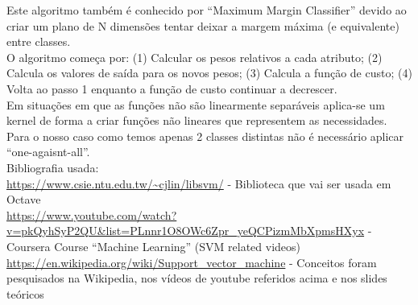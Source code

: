 \documentclass[portugues,final]{revdetua}
\begin{document}
Este algoritmo também é conhecido por “Maximum Margin Classifier” devido ao criar um plano de N dimensões tentar deixar a margem máxima (e equivalente) entre classes.\\

O algoritmo começa por: (1) Calcular os pesos relativos a cada atributo; (2) Calcula os valores de saída para os novos pesos; (3) Calcula a função de custo; (4) Volta ao passo 1 enquanto a função de custo continuar a decrescer.\\

Em situações em que as funções não são linearmente separáveis aplica-se um kernel de forma a criar funções não lineares que representem as necessidades.\\

Para o nosso caso como temos apenas 2 classes distintas não é necessário aplicar “one-agaisnt-all”.\\

Bibliografia usada:\\
\url{https://www.csie.ntu.edu.tw/~cjlin/libsvm/} - Biblioteca que vai ser usada em Octave\\
\url{https://www.youtube.com/watch?v=pkQyhSyP2QU&list=PLnnr1O8OWc6Zpr_yeQCPizmMbXpmsHXyx} - Coursera Course “Machine Learning” (SVM related videos)\\
\url{https://en.wikipedia.org/wiki/Support_vector_machine} - Conceitos foram pesquisados na Wikipedia, nos vídeos de youtube referidos acima e nos slides teóricos


\end{document}
